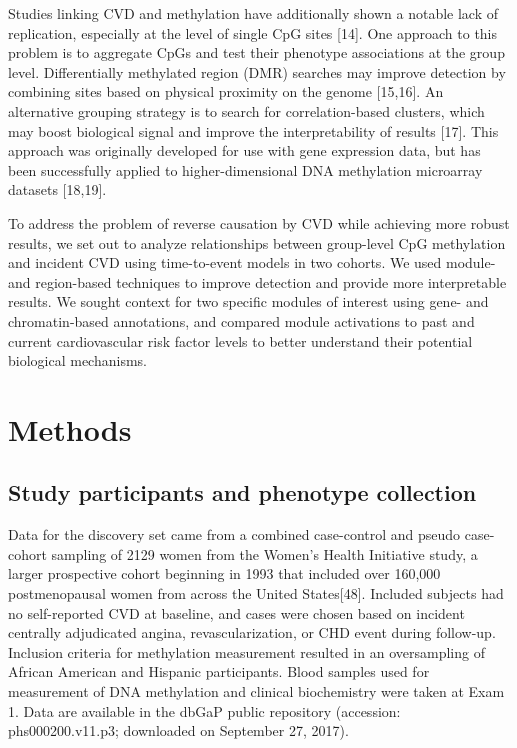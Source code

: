 \documentclass[]{bmcart}
\theoremstyle{definition}
\theoremstyle{definition}
\theoremstyle{definition}
\theoremstyle{remark}
\begin{document}
Studies linking CVD and methylation have additionally shown a notable
lack of replication, especially at the level of single CpG sites
{[}14{]}. One approach to this problem is to aggregate CpGs and test
their phenotype associations at the group level. Differentially
methylated region (DMR) searches may improve detection by combining
sites based on physical proximity on the genome {[}15,16{]}. An
alternative grouping strategy is to search for correlation-based
clusters, which may boost biological signal and improve the
interpretability of results {[}17{]}. This approach was originally
developed for use with gene expression data, but has been successfully
applied to higher-dimensional DNA methylation microarray datasets
{[}18,19{]}.

To address the problem of reverse causation by CVD while achieving more
robust results, we set out to analyze relationships between group-level
CpG methylation and incident CVD using time-to-event models in two
cohorts. We used module- and region-based techniques to improve
detection and provide more interpretable results. We sought context for
two specific modules of interest using gene- and chromatin-based
annotations, and compared module activations to past and current
cardiovascular risk factor levels to better understand their potential
biological mechanisms.

\section{Methods}\label{methods}

\subsection{Study participants and phenotype
collection}\label{study-participants-and-phenotype-collection}

Data for the discovery set came from a combined case-control and pseudo
case-cohort sampling of 2129 women from the Women's Health Initiative
study, a larger prospective cohort beginning in 1993 that included over
160,000 postmenopausal women from across the United States{[}48{]}.
Included subjects had no self-reported CVD at baseline, and cases were
chosen based on incident centrally adjudicated angina,
revascularization, or CHD event during follow-up. Inclusion criteria for
methylation measurement resulted in an oversampling of African American
and Hispanic participants. Blood samples used for measurement of DNA
methylation and clinical biochemistry were taken at Exam 1. Data are
available in the dbGaP public repository (accession: phs000200.v11.p3;
downloaded on September 27, 2017).
\end{document}
